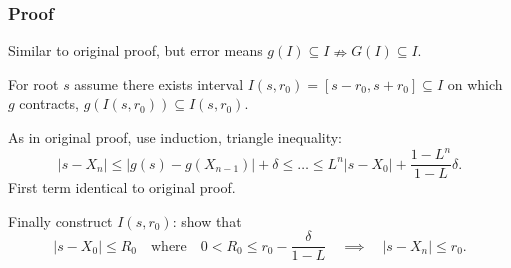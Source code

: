 \documentclass{beamer}
\begin{document}
\begin{frame}
  \frametitle{Proof}

  Similar to original proof, but error means $g(I) \subseteq I \nRightarrow G(I) \subseteq I$.

  \vspace{1ex}

  For root $s$ assume there exists interval $I(s, r_0) = [s - r_0, s + r_0] \subseteq I$ on which $g$ contracts, $g \left( I(s, r_0) \right) \subseteq I(s, r_0)$. \pause

  \vspace{1ex}

  As in original proof, use induction, triangle inequality:
  \begin{equation*}
    | s - X_n | \leq | g(s) - g(X_{n-1}) | + \delta \leq \dots \leq
    L^n | s - X_0 | + \frac{1 - L^n}{1 - L} \delta.
  \end{equation*}
  First term identical to original proof. \pause

  \vspace{1ex}

  Finally construct $I(s, r_0)$: show that
  \begin{equation*}
    |s - X_0| \leq R_0 \quad \text{where} \quad 0 < R_0 \leq r_0 -
    \frac{\delta}{1 - L} \quad \implies \quad | s - X_n | \leq r_0.
  \end{equation*}



\end{frame}
\end{document}
